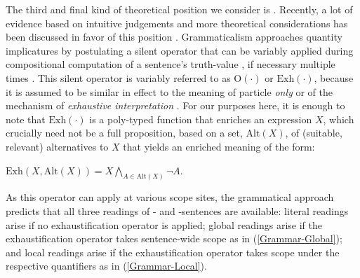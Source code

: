 \documentclass[fleqn,reqno,10pt,draft]{article}
\newcommand{\as}{\acro{as}}
\renewcommand{\es}{\acro{es}}
\newcommand{\exh}{\ensuremath{\mathrm{Exh}}}
\newcommand{\alt}{\ensuremath{\mathrm{Alt}}}
\begin{document}
The third and final kind of theoretical position we consider is
. Recently, a lot of evidence based on
intuitive judgements and more theoretical considerations has been
discussed in favor of this position
\citep[c.f.][]{Chierchia2006:Broaden-Your-Vi,Fox2007:Free-Choice-and,Magri2011:Another-Argumen,Sauerland2012:The-Computation,ChierchiaFox2008:The-Grammatical,Chierchia2012:FC-Nominals-and}. %
Grammaticalism approaches quantity implicatures by postulating a
silent operator that can be variably applied during compositional
computation of a sentence's truth-value
\citep{Chierchia2006:Broaden-Your-Vi}, if necessary multiple times
\citep{Fox2007:Free-Choice-and}. This silent operator is variably
referred to as $\mathrm{O}(\cdot)$ or $\exh(\cdot)$, because it is
assumed to be similar in effect to the meaning of particle \emph{only}
or of the mechanism of \emph{exhaustive interpretation}
\citep{GroenendijkStokhofThesis1984,Stechowvon-StechowZimmermann1984:Term-Answers-an,Rooijvan-RooijSchulz2013:Exhaustive-Inte,vanRooijSchulz:ExhaustiveInterpretation,Fox2007:Free-Choice-and}. For
our purposes here, it is enough to note that $\exh(\cdot)$ is a
poly-typed function that enriches an expression $X$, which crucially
need not be a full proposition, based on a set, $\alt(X)$, of
(suitable, relevant) alternatives to $X$ that yields an enriched
meaning of the form:
\begin{exe}
  \ex \label{bsp:Exh-Def} $\exh(X,\alt(X)) = X \bigwedge_{A \in
      \alt(X)} \neg A$.
\end{exe}

As this operator can apply at various scope sites, the grammatical
approach predicts that all three readings of \as- and \es-sentences
are available: literal readings arise if no exhaustification operator
is applied; global readings arise if the exhaustification operator
takes sentence-wide scope as in (\ref{Grammar-Global}); and local
readings arise if the exhaustification operator takes scope under the
respective quantifiers as in (\ref{Grammar-Local}).
\end{document}
